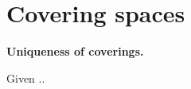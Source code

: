 \section{Covering spaces}

\begin{theorem}
\textbf{Uniqueness of coverings.}

Given ..
\end{theorem}
